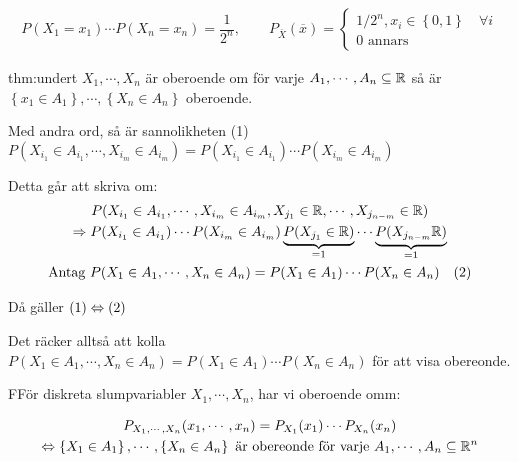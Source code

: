 \begin{equation*}
  \begin{gathered}
    P(X_1=x_1)\cdots P(X_n=x_n)=\dfrac{1}{2^n},\qquad P_{\overline{X}}(\overline{x}) = 
    \begin{cases*}
    1/2^n, x_i\in\left\{0,1\right\}\quad\forall i\\
    0\text{ annars}
    \end{cases*}
  \end{gathered}
\end{equation*}
\par\bigskip
\begin{theo}{thm:undert}
$X_1,\cdots,X_n$ är oberoende om för varje $A_1,\cdots,A_n\subseteq\mathbb{R}$ så är $\left\{x_1\in A_1\right\},\cdots,\left\{X_n\in A_n\right\}$ oberoende.
\end{theo}
\par\bigskip
\noindent Med andra ord, så är sannolikheten (1) $P(X_{i_{1}}\in A_{i_{1}},\cdots,X_{i_{m}}\in A_{i_{m}}) = P(X_{i_{1}}\in A_{i_{1}})\cdots P(X_{i_{m}}\in A_{i_{m}})$\par
\noindent Detta går att skriva om:
\begin{equation*}
  \begin{gathered}
    P(X_{i_{1}}\in A_{i_{1}},\cdots, X_{i_{m}}\in A_{i_{m}}, X_{j_{1}}\in\mathbb{R},\cdots, X_{j_{n-m}}\in\mathbb{R})\\
    \Rightarrow P(X_{i_{1}}\in A_{i_{1}})\cdots P(X_{i_{m}}\in A_{i_{m}})\underbrace{P(X_{j_{1}}\in\mathbb{R})}_{\text{=1}}\cdots \underbrace{P(X_{j_{n-m}}\mathbb{R})}_{\text{=1}}\\
    \text{Antag } P(X_1\in A_1,\cdots, X_n\in A_n) = P(X_1\in A_1)\cdots P(X_n\in A_n)\quad (2)
  \end{gathered}
\end{equation*}
\par\bigskip
\noindent Då gäller $(1)\Leftrightarrow (2)$\par
\noindent Det räcker alltså att kolla $P(X_1\in A_1,\cdots, X_n\in A_n) = P(X_1\in A_1)\cdots P(X_n\in A_n)$ för att visa obereonde.
\par\bigskip
\begin{theo}
  FFör diskreta slumpvariabler $X_1,\cdots, X_n$, har vi oberoende omm:\par 
  \begin{equation*}
    \begin{gathered}
      P_{X_1,\cdots,X_n}(x_1,\cdots,x_n) = P_{X_1}(x_1)\cdots P_{X_n}(x_n)\\
      \Leftrightarrow \left\{X_1\in A_1\right\},\cdots, \left\{X_n\in A_n\right\}\text{ är obereonde för varje } A_1,\cdots, A_n\subseteq\mathbb{R}^n
    \end{gathered}
  \end{equation*}
\end{theo}
